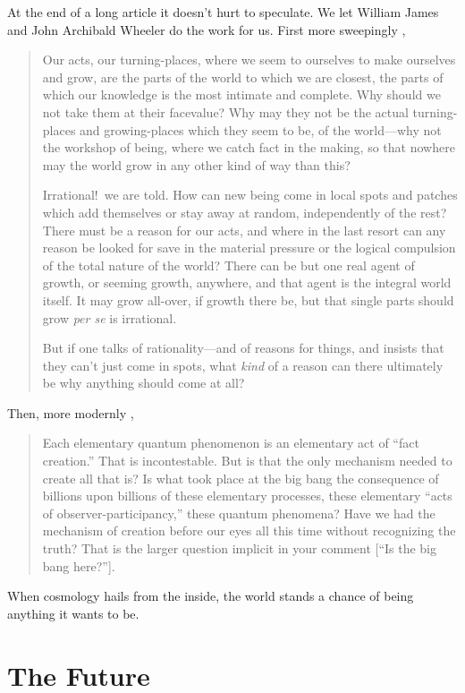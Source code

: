 \documentclass[aps,pra,superscriptaddress,12pt,tightenlines,nofootinbib]{revtex4-2}
\begin{document}
At the end of a long article it doesn't hurt to speculate.  We let William James and John Archibald Wheeler do the work for us.  First more sweepingly \cite{James22},
\begin{quote}
\noindent Our acts, our turning-places, where we seem to ourselves to
make ourselves and grow, are the parts of the world to which we are
closest, the parts of which our knowledge is the most intimate and
complete. Why should we not take them at their facevalue? Why may
they not be the actual turning-places and growing-places which they
seem to be, of the world---why not the workshop of being, where we
catch fact in the making, so that nowhere may the world grow in any
other kind of way than this?

Irrational!\ we are told. How can new being come in local spots and
patches which add themselves or stay away at random, independently of
the rest? There must be a reason for our acts, and where in the last
resort can any reason be looked for save in the material pressure or
the logical compulsion of the total nature of the world? There can be
but one real agent of growth, or seeming growth, anywhere, and that
agent is the integral world itself. It may grow all-over, if growth
there be, but that single parts should grow {\it per se\/} is
irrational.

But if one talks of rationality---and of reasons for things, and
insists that they can't just come in spots, what {\it kind\/} of a
reason can there ultimately be why anything should come at all?
\end{quote}
Then, more modernly \cite{Wheeler82c},
\begin{quote}
\noindent Each elementary quantum phenomenon is an elementary act of ``fact
creation.'' That is incontestable. But is that the only mechanism
needed to create all that is? Is what took place at the big bang the
consequence of billions upon billions of these elementary processes,
these elementary ``acts of observer-participancy,'' these quantum
phenomena? Have we had the mechanism of creation before our eyes all
this time without recognizing the truth? That is the larger question
implicit in your comment [``Is the big bang here?''].
\end{quote}
When cosmology hails from the inside, the world stands a chance of being anything it wants to be.

\section{The Future}
\end{document}
